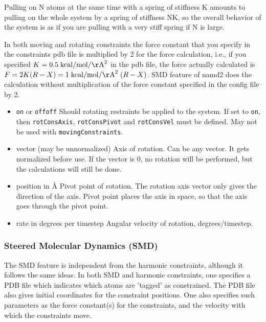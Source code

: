 Pulling on N atoms at the same time with a spring of stiffness K
   amounts to pulling on the whole system by a spring of stiffness NK,
   so the overall behavior of the system is as if you are pulling with a
   very stiff spring if N is large.

In both moving and rotating constraints the force constant that you
   specify in the constraints pdb file is multiplied by 2 for the force
   calculation, i.e., if you specified $K = 0.5 \; {\rm kcal}/{\rm mol}/{\rm \AA}^2$ in the pdb
file,
   the force actually calculated is $F = 2 K (R-X) = 1 \; {\rm kcal}/{\rm mol}/{\rm \AA}^2 \; (R-X)$.
   SMD feature of namd2 does the calculation without multiplication of
the
   force constant specified in the config file by 2.


\begin{itemize}

\item
{}
{{\tt on} or {\tt off}}{{\tt off}}
{Should rotating restraints be applied to the system. If set
to {\tt on}, then {\tt rotConsAxis}, {\tt rotConsPivot} and
{\tt rotConsVel} must be defined.
May not be used with {\tt movingConstraints}.}

\item
{}
{vector (may be unnormalized)}
{Axis of rotation. Can be any vector. It gets
normalized before use. If the vector is 0,
no rotation will be performed, but the calculations
will still be done.}

\item
{}
{position in \AA}
{Pivot point of rotation. The rotation axis vector
only gives the direction of the axis. Pivot point
places the axis in space, so that the axis goes
through the pivot point.}

\item
{}
{rate in degrees per timestep}
{Angular velocity of rotation, degrees/timestep.}

\end{itemize}


\subsubsection{Steered Molecular Dynamics (SMD)}

The SMD feature is independent from the harmonic constraints, although it
follows the same ideas.  In both SMD and harmonic constraints, one specifies
a PDB file which indicates which atoms are 'tagged' as constrained.  The PDB
file also gives initial coordinates for the constraint positions.  One also
specifies such parameters as the force constant(s) for the constraints, 
and the velocity with which the constraints move.  

